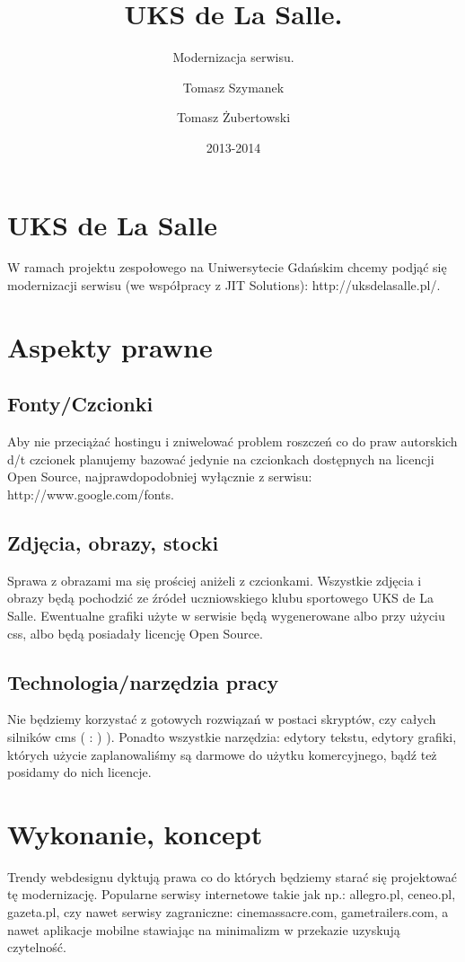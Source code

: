 \documentclass{scrartcl}
\title{UKS de La Salle.}
\subtitle{Modernizacja serwisu.}
\author{Tomasz Szymanek
\and
Tomasz Żubertowski}
\date{2013-2014}
\begin{document}
\maketitle

\section{UKS de La Salle}
W ramach projektu zespołowego na Uniwersytecie Gdańskim chcemy podjąć się modernizacji serwisu (we współpracy z JIT Solutions):
http://uksdelasalle.pl/.
\section{Aspekty prawne}
\subsection{Fonty/Czcionki}
Aby nie przeciążać hostingu i zniwelować problem roszczeń co do praw autorskich d/t czcionek planujemy bazować jedynie na czcionkach dostępnych na licencji Open Source, najprawdopodobniej wyłącznie z serwisu: 
http://www.google.com/fonts.
\subsection{Zdjęcia, obrazy, stocki}
Sprawa z obrazami ma się prościej aniżeli z czcionkami. Wszystkie zdjęcia i obrazy będą pochodzić ze źródeł uczniowskiego klubu sportowego UKS de La Salle. Ewentualne grafiki użyte w serwisie będą wygenerowane albo przy użyciu css, albo będą posiadały licencję Open Source.
\subsection{Technologia/narzędzia pracy}
Nie będziemy korzystać z gotowych rozwiązań w postaci skryptów, czy całych silników cms ( : ) ). Ponadto wszystkie narzędzia: edytory tekstu, edytory grafiki, których użycie zaplanowaliśmy są darmowe do użytku komercyjnego, bądź też posidamy do nich licencje.

\section{Wykonanie, koncept}
Trendy webdesignu dyktują prawa co do których będziemy starać się projektować tę modernizację. Popularne serwisy internetowe takie jak np.: allegro.pl, ceneo.pl, gazeta.pl, czy nawet serwisy zagraniczne: cinemassacre.com, gametrailers.com, a nawet aplikacje mobilne stawiając na minimalizm w przekazie uzyskują czytelność. 
\end{document}
